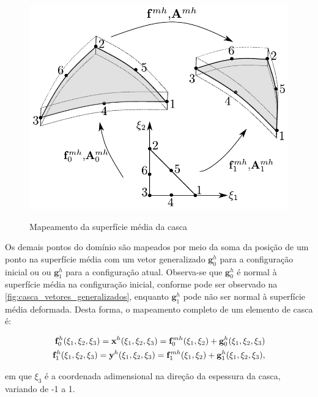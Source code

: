 \begin{figure}[!htbp]
	\caption{Mapeamento da superfície média da casca}
	\centering
	\includegraphics[scale=0.8,trim=0cm 0.0cm 0cm 0cm, clip=true]{Imagens/Cap4/casca_super_media.pdf}	
	\label{fig:casca:map_super_media}
\end{figure}

Os demais pontos do domínio são mapeados por meio da soma da posição de um ponto na superfície média com um vetor generalizado $\mathbf{g}^{h}_{0}$ para a configuração inicial ou ou $\mathbf{g}^{h}_{1}$ para a configuração atual. Observa-se que $\mathbf{g}^{h}_{0}$ é normal à superfície média na configuração inicial, conforme pode ser observado na \autoref{fig:casca_vetores_generalizados}, enquanto $\mathbf{g}^{h}_{1}$ pode não ser normal à superfície média deformada. Desta forma, o mapeamento completo de um elemento de casca é:

\begin{align}
\mathbf{f}^{h}_{0}(\xi_{1},\xi_{2},\xi_{3}) = \mathbf{x}^{h}(\xi_{1},\xi_{2},\xi_{3}) = \mathbf{f}^{mh}_{0}(\xi_{1},\xi_{2}) + \mathbf{g}^{h}_{0} (\xi_{1},\xi_{2}, \xi_{3}) \label{eq:fmap0}\\
\mathbf{f}^{h}_{1}(\xi_{1},\xi_{2},\xi_{3}) = \mathbf{y}^{h}(\xi_{1},\xi_{2},\xi_{3}) = \mathbf{f}^{mh}_{1}(\xi_{1},\xi_{2}) + \mathbf{g}^{h}_{1} (\xi_{1},\xi_{2}, \xi_{3}),  \label{eq:fmap1}
\end{align}

\noindent em que $\xi_3$ é a coordenada adimensional na direção da espessura da casca, variando de -1 a 1.

